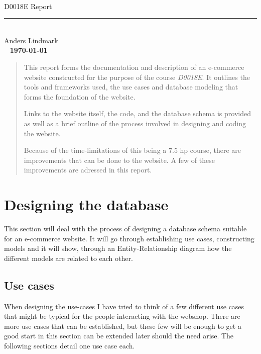 \documentclass[12pt, a4paper,titlepage]{article}
\begin{document}
\ifpdf
{}
\else
{}
\fi

\begin{titlepage}
\ 
\begin{center}
\vfill
{\huge\sffamily D0018E Report}
\rule{\linewidth}{0.3mm}\\
Anders Lindmark \\
\vfill
\ 
\vfill
{\textbf{\today}}
\end{center}
\end{titlepage}

\renewcommand{\abstractname}{Executive Summary}
\begin{abstract}
This report forms the documentation and description of an e-commerce 
website constructed for the purpose of the course \emph{D0018E}. It outlines the
tools and frameworks used, the use cases and database modeling that forms
the foundation of the website.

Links to the website itself, the code, and the database schema is provided as
well as a brief outline of the process involved in designing and coding the
website.

Because of the time-limitations of this being a $7.5$ hp course, there are
improvements that can be done to the website. A few of these improvements
are adressed in this report.
\end{abstract}

\tableofcontents
\thispagestyle{empty}
\newpage
\setcounter{page}{1}

\section{Designing the database}
This section will deal with the process of designing a database schema 
suitable for an e-commerce website.
It will go through establishing use cases, constructing models and it will 
show, through an Entity-Relationship diagram how the different models are related 
to each other.

\subsection{Use cases}
When designing the use-cases I have tried to think of a few different use cases
that might be typical for the people interacting with the webshop. 
There are more use cases that can be established, but these few will be
enough to get a good start in this section can be extended later should the
need arise. The following sections detail one use case each.
\end{document}
